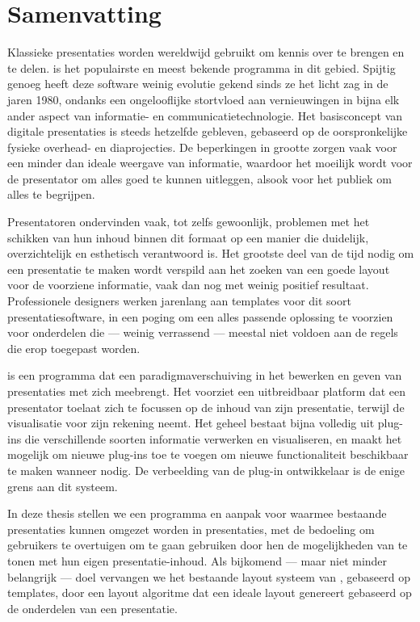 
 \chapter*{Samenvatting}

  Klassieke presentaties worden wereldwijd gebruikt om kennis over te
  brengen en te delen. \ppt* is het populairste en meest bekende programma in
  dit gebied. Spijtig genoeg heeft deze software weinig evolutie gekend sinds
  ze het licht zag in de jaren 1980, ondanks een ongelooflijke stortvloed aan
  vernieuwingen in bijna elk ander aspect van informatie- en
  communicatietechnologie. Het basisconcept van digitale presentaties is steeds
  hetzelfde gebleven, gebaseerd op de oorspronkelijke fysieke overhead- en
  diaprojecties. De beperkingen in grootte zorgen vaak voor een minder dan
  ideale weergave van informatie, waardoor het moeilijk wordt voor de
  presentator om alles goed te kunnen uitleggen, alsook voor het publiek om
  alles te begrijpen.

  Presentatoren ondervinden vaak, tot zelfs gewoonlijk, problemen met het
  schikken van hun inhoud binnen dit formaat op een manier die duidelijk,
  overzichtelijk en esthetisch verantwoord is. Het grootste deel van de tijd
  nodig om een presentatie te maken wordt verspild aan het zoeken van een goede
  layout voor de voorziene informatie, vaak dan nog met weinig positief
  resultaat. Professionele designers werken jarenlang aan templates voor dit
  soort presentatiesoftware, in een poging om een alles passende oplossing te
  voorzien voor onderdelen die --- weinig verrassend --- meestal niet voldoen
  aan de regels die erop toegepast worden.

  \mxp is een programma dat een paradigmaverschuiving in het bewerken en geven
  van presentaties met zich meebrengt. Het voorziet een uitbreidbaar platform
  dat een presentator toelaat zich te focussen op de inhoud van zijn
  presentatie, terwijl \mxp de visualisatie voor zijn rekening neemt. Het
  geheel bestaat bijna volledig uit plug-ins die verschillende soorten
  informatie verwerken en visualiseren, en maakt het mogelijk om nieuwe
  plug-ins toe te voegen om nieuwe functionaliteit beschikbaar te maken wanneer
  nodig. De verbeelding van de plug-in ontwikkelaar is de enige grens aan dit
  systeem.

  In deze thesis stellen we een programma en aanpak voor waarmee bestaande \ppt
  presentaties kunnen omgezet worden in \mxp presentaties, met de bedoeling om
  \ppt gebruikers te overtuigen om \mxp te gaan gebruiken door hen de
  mogelijkheden van \mxp te tonen met hun eigen presentatie-inhoud. Als
  bijkomend --- maar niet minder belangrijk --- doel vervangen we het bestaande
  layout systeem van \mxp, gebaseerd op templates, door een layout algoritme
  dat een ideale layout genereert gebaseerd op de onderdelen van een
  presentatie.


